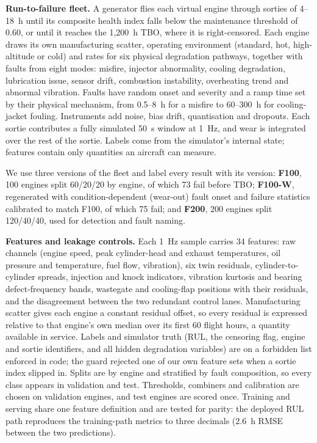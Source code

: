 \noindent\textbf{Run-to-failure fleet.} A generator flies each virtual engine through sorties of 4--18~h until its composite health index falls below the maintenance threshold of 0.60, or until it reaches the 1,200~h TBO, where it is right-censored. Each engine draws its own manufacturing scatter, operating environment (standard, hot, high-altitude or cold) and rates for six physical degradation pathways, together with faults from eight modes: misfire, injector abnormality, cooling degradation, lubrication issue, sensor drift, combustion instability, overheating trend and abnormal vibration. Faults have random onset and severity and a ramp time set by their physical mechanism, from 0.5--8~h for a misfire to 60--300~h for cooling-jacket fouling. Instruments add noise, bias drift, quantisation and dropouts. Each sortie contributes a fully simulated 50~s window at 1~Hz, and wear is integrated over the rest of the sortie. Labels come from the simulator's internal state; features contain only quantities an aircraft can measure.

We use three versions of the fleet and label every result with its version: \textbf{F100}, 100 engines split 60/20/20 by engine, of which 73 fail before TBO; \textbf{F100-W}, regenerated with condition-dependent (wear-out) fault onset and failure statistics calibrated to match F100, of which 75 fail; and \textbf{F200}, 200 engines split 120/40/40, used for detection and fault naming.

\noindent\textbf{Features and leakage controls.} Each 1~Hz sample carries 34 features: raw channels (engine speed, peak cylinder-head and exhaust temperatures, oil pressure and temperature, fuel flow, vibration), six twin residuals, cylinder-to-cylinder spreads, injection and knock indicators, vibration kurtosis and bearing defect-frequency bands, wastegate and cooling-flap positions with their residuals, and the disagreement between the two redundant control lanes. Manufacturing scatter gives each engine a constant residual offset, so every residual is expressed relative to that engine's own median over its first 60 flight hours, a quantity available in service. Labels and simulator truth (RUL, the censoring flag, engine and sortie identifiers, and all hidden degradation variables) are on a forbidden list enforced in code; the guard rejected one of our own feature sets when a sortie index slipped in. Splits are by engine and stratified by fault composition, so every class appears in validation and test. Thresholds, combiners and calibration are chosen on validation engines, and test engines are scored once. Training and serving share one feature definition and are tested for parity: the deployed RUL path reproduces the training-path metrics to three decimals (2.6~h RMSE between the two predictions).

